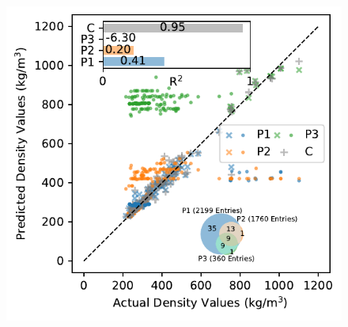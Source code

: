 \documentclass{article}
\begin{document}
	\begin{figure}[h]
		\centering
		\includegraphics[]{scatterPlot.pdf}
		\caption{} 
		\label{fig: exampleFig}
	\end{figure}
\end{document}
